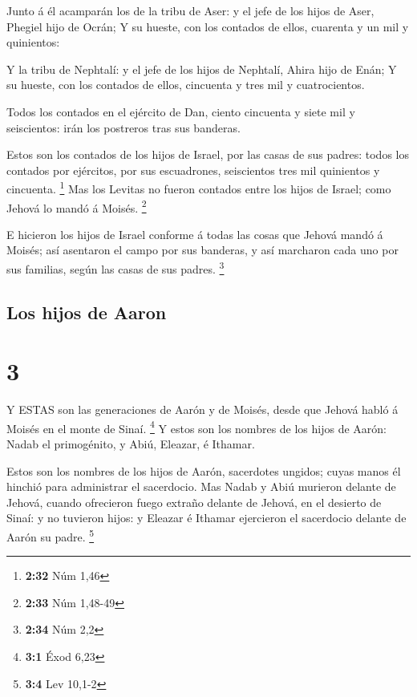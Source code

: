  Junto á él acamparán los de la tribu de Aser: y el jefe de
los hijos de Aser, Phegiel hijo de Ocrán;  Y su hueste, con
los contados de ellos, cuarenta y un mil y quinientos:

 Y la tribu de Nephtalí: y el jefe de los hijos de
Nephtalí, Ahira hijo de Enán;  Y su hueste, con los
contados de ellos, cincuenta y tres mil y cuatrocientos.

 Todos los contados en el ejército de Dan, ciento cincuenta
y siete mil y seiscientos: irán los postreros tras sus banderas.

 Estos son los contados de los hijos de Israel, por las
casas de sus padres: todos los contados por ejércitos, por sus
escuadrones, seiscientos tres mil quinientos y cincuenta. \footnote{\textbf{2:32}
  Núm 1,46}  Mas los Levitas no fueron contados entre los
hijos de Israel; como Jehová lo mandó á Moisés. \footnote{\textbf{2:33}
  Núm 1,48-49}

 E hicieron los hijos de Israel conforme á todas las cosas
que Jehová mandó á Moisés; así asentaron el campo por sus banderas, y
así marcharon cada uno por sus familias, según las casas de sus padres.
\footnote{\textbf{2:34} Núm 2,2}

\hypertarget{los-hijos-de-aaron}{%
\subsection{Los hijos de Aaron}\label{los-hijos-de-aaron}}

\hypertarget{section-2}{%
\section{3}\label{section-2}}

 Y ESTAS son las generaciones de Aarón y de Moisés, desde
que Jehová habló á Moisés en el monte de Sinaí. \footnote{\textbf{3:1}
  Éxod 6,23}  Y estos son los nombres de los hijos de Aarón:
Nadab el primogénito, y Abiú, Eleazar, é Ithamar.

 Estos son los nombres de los hijos de Aarón, sacerdotes
ungidos; cuyas manos él hinchió para administrar el sacerdocio.
 Mas Nadab y Abiú murieron delante de Jehová, cuando
ofrecieron fuego extraño delante de Jehová, en el desierto de Sinaí: y
no tuvieron hijos: y Eleazar é Ithamar ejercieron el sacerdocio delante
de Aarón su padre. \footnote{\textbf{3:4} Lev 10,1-2}

